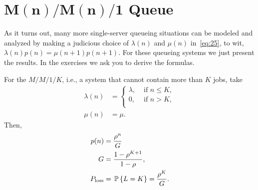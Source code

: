 \section
[$M(n)/M(n)/1$ Queue]
{$\mathbf{M(n)/M(n)/1}$ Queue}
\label{sec:mnmn1}

As it turns out, many more single-server queueing situations can be
modeled and analyzed by making a judicious choice of $\lambda(n)$ and
$\mu(n)$ in~\eqref{eq:25}, to wit,
$ \lambda(n) p(n) = \mu(n+1)p(n+1)$. For these queueing systems we
just present the results. In the exercises we ask you to derive the
formulas.

For the $M/M/1/K$, i.e., a system that cannot contain more than $K$ jobs, take
  \begin{align*}
    \lambda(n) &= 
  \begin{cases}
    \lambda, &\text{ if } n \leq K, \\
    0, &\text{ if } n > K, \\
  \end{cases} \\
\mu(n) &= \mu.
  \end{align*}
  Then,
\begin{subequations}\label{eq:8}
 \begin{align}
p(n) &=  \frac{\rho^n}G\\
G &= \frac{1-\rho^{K+1}}{1-\rho}, \\
P_{\text{loss}} &= \P{L=K} = \frac{\rho^K}G.
\end{align}
\end{subequations}


